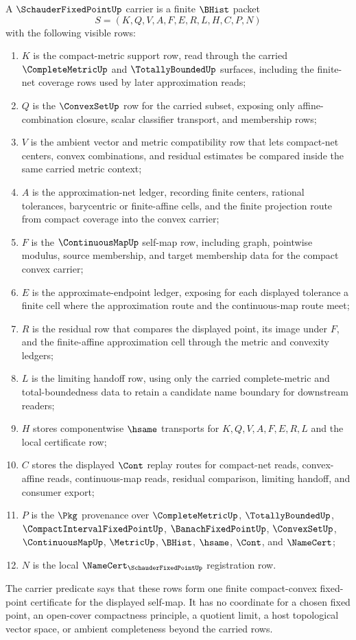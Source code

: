 \begin{definition}
\label{def:schauder-fixed-point-carrier}
A $\SchauderFixedPointUp$ carrier is a finite $\BHist$ packet
$$
S=(K,Q,V,A,F,E,R,L,H,C,P,N)
$$
with the following visible rows:
\begin{enumerate}
\item $K$ is the compact-metric support row, read through the carried $\CompleteMetricUp$ and $\TotallyBoundedUp$ surfaces, including the finite-net coverage rows used by later approximation reads;
\item $Q$ is the $\ConvexSetUp$ row for the carried subset, exposing only affine-combination closure, scalar classifier transport, and membership rows;
\item $V$ is the ambient vector and metric compatibility row that lets compact-net centers, convex combinations, and residual estimates be compared inside the same carried metric context;
\item $A$ is the approximation-net ledger, recording finite centers, rational tolerances, barycentric or finite-affine cells, and the finite projection route from compact coverage into the convex carrier;
\item $F$ is the $\ContinuousMapUp$ self-map row, including graph, pointwise modulus, source membership, and target membership data for the compact convex carrier;
\item $E$ is the approximate-endpoint ledger, exposing for each displayed tolerance a finite cell where the approximation route and the continuous-map route meet;
\item $R$ is the residual row that compares the displayed point, its image under $F$, and the finite-affine approximation cell through the metric and convexity ledgers;
\item $L$ is the limiting handoff row, using only the carried complete-metric and total-boundedness data to retain a candidate name boundary for downstream readers;
\item $H$ stores componentwise $\hsame$ transports for $K,Q,V,A,F,E,R,L$ and the local certificate row;
\item $C$ stores the displayed $\Cont$ replay routes for compact-net reads, convex-affine reads, continuous-map reads, residual comparison, limiting handoff, and consumer export;
\item $P$ is the $\Pkg$ provenance over $\CompleteMetricUp$, $\TotallyBoundedUp$, $\CompactIntervalFixedPointUp$, $\BanachFixedPointUp$, $\ConvexSetUp$, $\ContinuousMapUp$, $\MetricUp$, $\BHist$, $\hsame$, $\Cont$, and $\NameCert$;
\item $N$ is the local $\NameCert_{\SchauderFixedPointUp}$ registration row.
\end{enumerate}
The carrier predicate says that these rows form one finite compact-convex fixed-point certificate for the displayed self-map. It has no coordinate for a chosen fixed point, an open-cover compactness principle, a quotient limit, a host topological vector space, or ambient completeness beyond the carried rows.
\end{definition}

